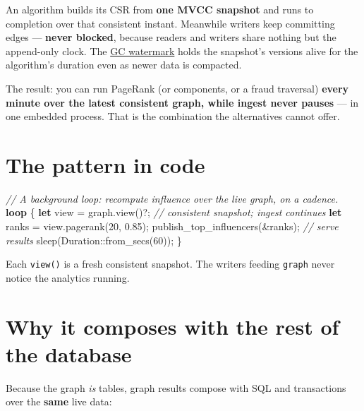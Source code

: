 \documentclass[
  11pt,
  openany]{book}
\newenvironment{Shaded}{}{}
\newcommand{\CommentTok}[1]{\textcolor[rgb]{0.38,0.63,0.69}{\textit{#1}}}
\newcommand{\ControlFlowTok}[1]{\textcolor[rgb]{0.00,0.44,0.13}{\textbf{#1}}}
\newcommand{\DecValTok}[1]{\textcolor[rgb]{0.25,0.63,0.44}{#1}}
\newcommand{\KeywordTok}[1]{\textcolor[rgb]{0.00,0.44,0.13}{\textbf{#1}}}
\newcommand{\NormalTok}[1]{#1}
\newcommand{\OperatorTok}[1]{\textcolor[rgb]{0.40,0.40,0.40}{#1}}
\newcommand{\PreprocessorTok}[1]{\textcolor[rgb]{0.74,0.48,0.00}{#1}}
\begin{document}
An algorithm builds its CSR from \textbf{one MVCC snapshot} and runs to
completion over that consistent instant. Meanwhile writers keep
committing edges --- \textbf{never blocked}, because readers and writers
share nothing but the append-only clock. The \href{../engine/mvcc.md}{GC
watermark} holds the snapshot's versions alive for the algorithm's
duration even as newer data is compacted.

The result: you can run PageRank (or components, or a fraud traversal)
\textbf{every minute over the latest consistent graph, while ingest
never pauses} --- in one embedded process. That is the combination the
alternatives cannot offer.

\section{The pattern in code}\label{the-pattern-in-code}

\begin{Shaded}
\begin{Highlighting}[]
\CommentTok{// A background loop: recompute influence over the live graph, on a cadence.}
\ControlFlowTok{loop} \OperatorTok{\{}
    \KeywordTok{let}\NormalTok{ view }\OperatorTok{=}\NormalTok{ graph}\OperatorTok{.}\NormalTok{view()}\OperatorTok{?;}              \CommentTok{// consistent snapshot; ingest continues}
    \KeywordTok{let}\NormalTok{ ranks }\OperatorTok{=}\NormalTok{ view}\OperatorTok{.}\NormalTok{pagerank(}\DecValTok{20}\OperatorTok{,} \DecValTok{0.85}\NormalTok{)}\OperatorTok{;}
\NormalTok{    publish\_top\_influencers(}\OperatorTok{\&}\NormalTok{ranks)}\OperatorTok{;}       \CommentTok{// serve results}
\NormalTok{    sleep(}\PreprocessorTok{Duration::}\NormalTok{from\_secs(}\DecValTok{60}\NormalTok{))}\OperatorTok{;}
\OperatorTok{\}}
\end{Highlighting}
\end{Shaded}

Each \texttt{view()} is a fresh consistent snapshot. The writers feeding
\texttt{graph} never notice the analytics running.

\section{Why it composes with the rest of the
database}\label{why-it-composes-with-the-rest-of-the-database}

Because the graph \emph{is} tables, graph results compose with SQL and
transactions over the \textbf{same} live data:
\end{document}
